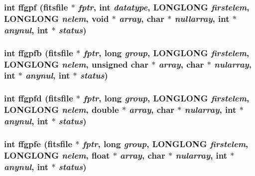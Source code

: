 \subsubsection{\setlength{\rightskip}{0pt plus 5cm}int ffgpf (\bf{fitsfile} $\ast$ {\em fptr}, int {\em datatype}, \bf{LONGLONG} {\em firstelem}, \bf{LONGLONG} {\em nelem}, void $\ast$ {\em array}, char $\ast$ {\em nullarray}, int $\ast$ {\em anynul}, int $\ast$ {\em status})}\label{test_2shm__client_2fitsio_8h_fd98f4b7e140059770ec7fa0396a5b46}


\subsubsection{\setlength{\rightskip}{0pt plus 5cm}int ffgpfb (\bf{fitsfile} $\ast$ {\em fptr}, long {\em group}, \bf{LONGLONG} {\em firstelem}, \bf{LONGLONG} {\em nelem}, unsigned char $\ast$ {\em array}, char $\ast$ {\em nularray}, int $\ast$ {\em anynul}, int $\ast$ {\em status})}\label{test_2shm__client_2fitsio_8h_b3ed324412e62cb24a95691ab0ab7bb1}


\subsubsection{\setlength{\rightskip}{0pt plus 5cm}int ffgpfd (\bf{fitsfile} $\ast$ {\em fptr}, long {\em group}, \bf{LONGLONG} {\em firstelem}, \bf{LONGLONG} {\em nelem}, double $\ast$ {\em array}, char $\ast$ {\em nularray}, int $\ast$ {\em anynul}, int $\ast$ {\em status})}\label{test_2shm__client_2fitsio_8h_f07b2a21749be57deb75f5b64431f653}


\subsubsection{\setlength{\rightskip}{0pt plus 5cm}int ffgpfe (\bf{fitsfile} $\ast$ {\em fptr}, long {\em group}, \bf{LONGLONG} {\em firstelem}, \bf{LONGLONG} {\em nelem}, float $\ast$ {\em array}, char $\ast$ {\em nularray}, int $\ast$ {\em anynul}, int $\ast$ {\em status})}\label{test_2shm__client_2fitsio_8h_1a079011790bd529d65496708911d743}


